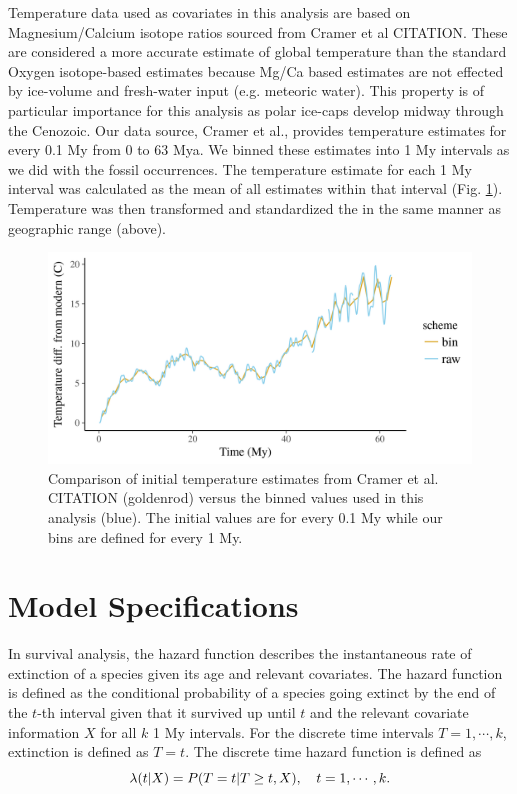 \documentclass[12pt,letterpaper]{article}
\begin{document}
Temperature data used as covariates in this analysis are based on Magnesium/Calcium isotope ratios sourced from Cramer et al CITATION. These are considered a more accurate estimate of global temperature than the standard Oxygen isotope-based estimates because Mg/Ca based estimates are not effected by ice-volume and fresh-water input (e.g. meteoric water). This property is of particular importance for this analysis as polar ice-caps develop midway through the Cenozoic. Our data source, Cramer et al., provides temperature estimates for every 0.1 My from 0 to 63 Mya. We binned these estimates into 1 My intervals as we did with the fossil occurrences. The temperature estimate for each 1 My interval was calculated as the mean of all estimates within that interval (Fig. \ref{fig:temp_curve}). Temperature was then transformed and standardized the in the same manner as geographic range (above).

\begin{figure}[ht]
  \centering
  \includegraphics[width=\textwidth,height=0.5\textheight,keepaspectratio=true]{figure/cramer_temp}
  \caption{Comparison of initial temperature estimates from Cramer et al. CITATION (goldenrod) versus the binned values used in this analysis (blue). The initial values are for every 0.1 My while our bins are defined for every 1 My.}
  \label{fig:temp_curve}
\end{figure}


\section{Model Specifications}

In survival analysis, the hazard function describes the instantaneous rate of extinction of a species given its age and relevant covariates. The hazard function is defined as the conditional probability of a species going extinct by the end of the \(t\)-th interval given that it survived up until \(t\) and the relevant covariate information \(X\) for all \(k\) 1 My intervals. For the discrete time intervals \(T = 1, \cdots, k\), extinction is defined as \(T = t\). The discrete time hazard function is defined as
\begin{equation}
  \lambda(t | X) = P(T = t | T \geq t, X), \quad t = 1, \cdots, k. \\
  \label{eq:hazard}
\end{equation}
\end{document}
